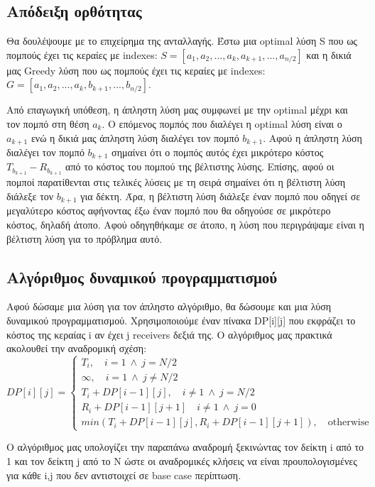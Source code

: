 \documentclass[a4paper,oneside, 11pt]{article}
\begin{document}
\subsection*{Απόδειξη ορθότητας}
Θα δουλέψουμε με το επιχείρημα της ανταλλαγής. Έστω μια optimal λύση S που ως πομπούς έχει τις κεραίες με indexes: $S=[a_1, a_2,...,a_k, a_{k+1}, ..., a_{n/2}]$
και η δικιά μας Greedy λύση που ως πομπούς έχει τις κεραίες με indexes: $G=[a_1, a_2, ..., a_k, b_{k+1}, ..., b_{n/2}]$. \bigbreak 

Από επαγωγική υπόθεση, η άπληστη λύση μας συμφωνεί με την optimal μέχρι και τον πομπό στη θέση $a_k$. Ο επόμενος πομπός που διαλέγει η optimal λύση είναι ο $a_{k+1}$ ενώ η δικιά μας άπληστη λύση διαλέγει τον πομπό $b_{k+1}$. Αφού η άπληστη λύση διαλέγει τον πομπό $b_{k+1}$ σημαίνει ότι ο πομπός αυτός έχει μικρότερο κόστος $T_{b_{k+1}} - R_{b_{k+1}}$ από το κόστος του πομπού της βέλτιστης λύσης. Επίσης, αφού οι πομποί παρατίθενται στις τελικές λύσεις με τη σειρά σημαίνει ότι η βέλτιστη λύση διάλεξε τον $b_{k+1}$ για δέκτη. Άρα, η βέλτιστη λύση διάλεξε έναν πομπό που οδηγεί σε μεγαλύτερο κόστος αφήνοντας έξω έναν πομπό που θα οδηγούσε σε μικρότερο κόστος, δηλαδή άτοπο. Αφού οδηγηθήκαμε σε άτοπο, η λύση που περιγράψαμε είναι η βέλτιστη λύση για το πρόβλημα αυτό.
\subsection*{Αλγόριθμος δυναμικού προγραμματισμού}
Αφού δώσαμε μια λύση για τον άπληστο αλγόριθμο, θα δώσουμε και μια λύση δυναμικού προγραμματισμού. Χρησιμοποιούμε έναν πίνακα DP[i][j] που εκφράζει το κόστος της κεραίας i αν έχει j receivers δεξιά της. Ο αλγόριθμος μας πρακτικά ακολουθεί την αναδρομική σχέση:
$$DP[i][j] = \left\{
\begin{array}{llll}
T_i, \quad i=1 \ \wedge \ j = N/2 \\
\infty, \quad i= 1 \ \wedge \ j\neq N/2 \\
T_i + DP[i-1][j], \quad i\neq 1 \ \wedge \ j=N/2 \\
R_i + DP[i-1][j+1] \quad i\neq 1 \ \wedge \ j=0 \\
min\left( T_i + DP[i-1][j], R_i + DP[i-1][j+1]\right), \quad \textrm{otherwise}
\end{array}
\right.$$

Ο αλγόριθμος μας υπολογίζει την παραπάνω αναδρομή ξεκινώντας τον δείκτη i από το 1 και τον δείκτη j από το N ώστε οι αναδρομικές κλήσεις να είναι προυπολογισμένες για κάθε i,j που δεν αντιστοιχεί σε base case περίπτωση. 
\end{document}
